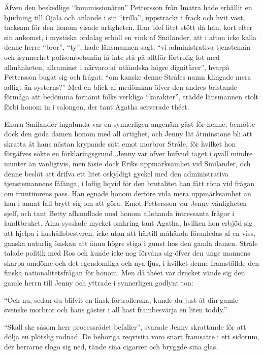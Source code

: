 Äfven den beskedlige ``kommissionären'' Pettersson från Imatra hade
erhållit en bjudning till Ojala och anlände i sin ``trilla'', uppsträckt
i frack och hvit väst, tacksam för den honom visade artigheten. Han blef
litet stött då han, kort efter sin ankomst, i mystiska ordalag erhöll en
vink af Smilander, att i afton icke kalla denne herre ``bror'', ``ty'',
hade länsmannen sagt, ``vi administrativa tjenstemän och isynnerhet
polisembetsmän få inte stå på alltför förtrolig fot med allmänheten,
allraminst i närvaro af utländska högre dignitärer'', hvarpå Pettersson
bugat sig och frågat: ``om kanske denne Stråles namn klingade mera
adligt än systerns?'' Med en blick af medömkan öfver den andres
bristande förmåga att bedömma förnämt folks verkliga ``karakter'',
trädde länsmannen stolt förbi honom in i salongen, der tant Agatha
serverade théet.

Ehuru Smilander ingalunda var en synnerligen angenäm gäst för henne,
bemötte dock den goda damen honom med all artighet, och Jenny lät
åtminstone bli att skratta åt hans nästan krypande sätt emot morbror
Stråle, för hvilket hon förgäfves sökte en förklaringsgrund. Jenny var
öfver hufvud taget i qväll mindre munter än vanligtvis, men fäste dock
Eriks uppmärksamhet vid Smilander, och denne beslöt att drifva ett litet
oskyldigt gyckel med den administrativa tjenstemannens fåfänga, i loflig
liqvid för den brutalitet han fått röna vid frågan om fruntimrens pass.
Han egnade honom derföre vida mera uppmärksamhet än han i annat fall
brytt sig om att göra. Emot Pettersson var Jenny vänligheten sjelf, och
tant Betty afhandlade med honom allehanda intressanta frågor i
landtbruket. Aina sysslade mycket omkring tant Agatha, hvilken hon
erbjöd sig att hjelpa i hushållsbestyren, icke utan att härtill måhända
föranledas af en viss, ganska naturlig önskan att ännu högre stiga i
gunst hos den gamla damen. Stråle talade politik med Ros och kunde icke
nog förvåna sig öfver den unge mannens skarpa omdöme och det egendomliga
och nya ljus, i hvilket denne framställde den finska nationalitetsfrågan
för honom. Men då théet var drucket vände sig den gamle herrn till Jenny
och yttrade i synnerligen godlynt ton:

``Och nu, sedan du blifvit en finsk förtrollerska, kunde du just åt din
gamle svenske morbror och hans gäster i all hast frambesvärja en liten
toddy.''

``Skall ske såsom herr processrådet befaller'', svarade Jenny skrattande
för att dölja en plötslig rodnad. De behöriga reqvisita voro snart
framsatte i ett sidorum, der herrarne slogo sig ned, tände sina cigarrer
och bryggde sina glas.

